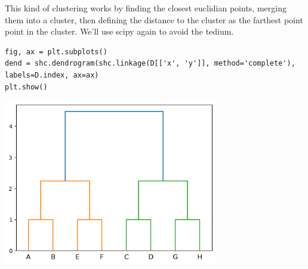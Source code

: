 \documentclass[11pt]{article}
\begin{document}
This kind of clustering works by finding the closest euclidian points, merging
them into a cluster, then defining the distance to the cluster as the farthest point
point in the cluster. We'll use scipy again to avoid the tedium.
\begin{verbatim}
fig, ax = plt.subplots()
dend = shc.dendrogram(shc.linkage(D[['x', 'y']], method='complete'), labels=D.index, ax=ax)
plt.show()
\end{verbatim}

\begin{center}
\includegraphics[width=0.7\textwidth]{./.ob-jupyter/32df2fc3bda014e92a08d750e03efcf510f513fa.png}
\end{center}
\end{document}
